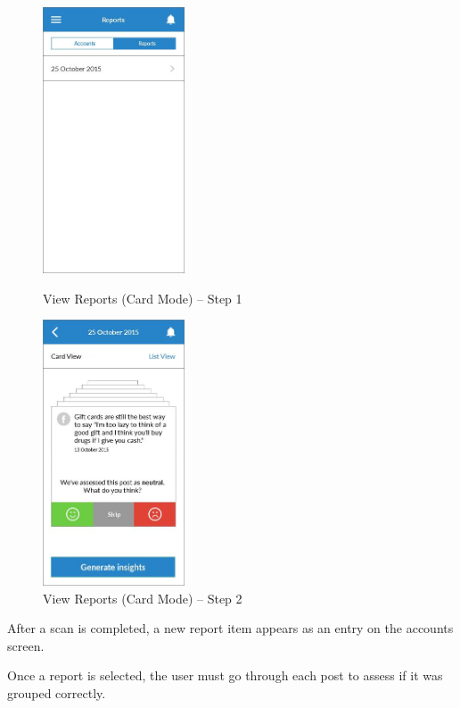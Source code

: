 \begin{figure}
  \subfigures
  \centering
  \begin{minipage}{4.6cm}
    \centering
    \includegraphics[width=4.2cm]{inc/ui_report_card_mode_step1.jpg}
    \caption{View Reports (Card Mode) -- Step 1}
    \label{fig:ui_report_card_mode_step1}
  \end{minipage}
  \begin{minipage}{4.6cm}
    \centering
    \includegraphics[width=4.2cm]{inc/ui_report_card_mode_step2.jpg}
    \caption{View Reports (Card Mode) -- Step 2}
    \label{fig:ui_report_card_mode_step2}
  \end{minipage}
\end{figure}

\begin{minipage}{\textwidth}
  \centering
  \begin{minipage}[t]{4.6cm}
    \vspace{0pt}
    \centering
    \begin{minipage}{4.4cm}
      After a scan is completed, a new report item appears as an entry on the accounts screen.
    \end{minipage}
  \end{minipage}
  \begin{minipage}[t]{4.6cm}
    \vspace{0pt}
    \centering
    \begin{minipage}{4.4cm}
      Once a report is selected, the user must go through each post to assess if it was grouped correctly.
    \end{minipage}
  \end{minipage}
\end{minipage}

